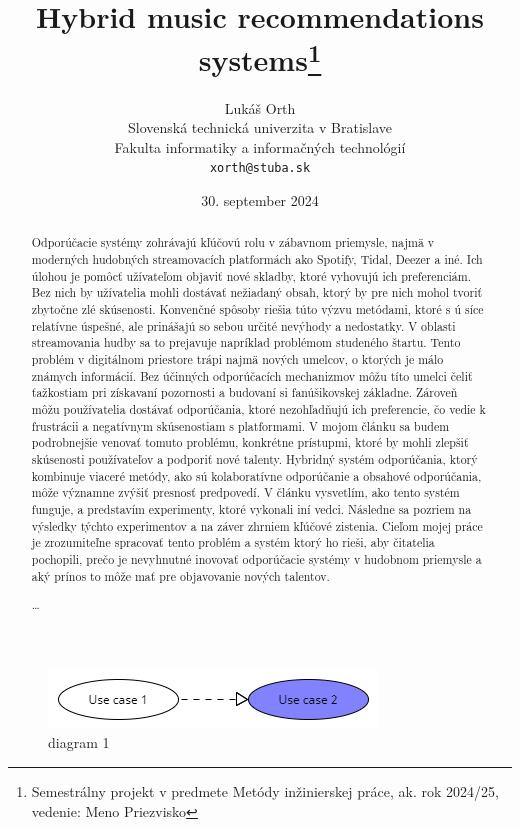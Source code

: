 \documentclass[10pt,twoside,slovak,a4paper]{coursepaper}
\title{Hybrid music recommendations systems\thanks{Semestrálny projekt v predmete Metódy inžinierskej práce, ak. rok 2024/25, vedenie: Meno Priezvisko}} %
\author{Lukáš Orth\\[2pt]
	{\small Slovenská technická univerzita v Bratislave}\\
	{\small Fakulta informatiky a informačných technológií}\\
	{\small \texttt{xorth@stuba.sk}}
	}
\date{\small 30. september 2024} %
\begin{document}
\maketitle

\begin{abstract}
Odporúčacie systémy zohrávajú kľúčovú rolu v zábavnom priemysle, najmä v moderných hudobných streamovacích platformách ako Spotify, Tidal, Deezer a iné. Ich úlohou je pomôcť užívateľom objaviť nové skladby, ktoré vyhovujú ich preferenciám. Bez nich by užívatelia mohli dostávať nežiadaný obsah, ktorý by pre nich mohol tvoriť zbytočne zlé skúsenosti. Konvenčné spôsoby riešia túto výzvu metódami, ktoré s	ú síce relatívne úspešné, ale prinášajú so sebou určité nevýhody a nedostatky. V oblasti streamovania hudby sa to prejavuje napríklad problémom studeného štartu. Tento problém v digitálnom priestore trápi najmä nových umelcov, o ktorých je málo známych informácií. Bez účinných odporúčacích mechanizmov môžu títo umelci čeliť ťažkostiam pri získavaní pozornosti a budovaní si fanúšikovskej základne. Zároveň môžu používatelia dostávať odporúčania, ktoré nezohľadňujú ich preferencie, čo vedie k frustrácii a negatívnym skúsenostiam s platformami.
V mojom článku sa budem podrobnejšie venovať tomuto problému, konkrétne prístupmi, ktoré by mohli zlepšiť skúsenosti používateľov a podporiť nové talenty. Hybridný systém odporúčania, ktorý kombinuje viaceré metódy, ako sú kolaboratívne odporúčanie a obsahové odporúčania, môže významne zvýšiť presnosť predpovedí. V článku vysvetlím, ako tento systém funguje, a predstavím experimenty, ktoré vykonali iní vedci. Následne sa pozriem na výsledky týchto experimentov a na záver zhrniem kľúčové zistenia. Cieľom mojej práce je zrozumiteľne spracovať tento problém a systém ktorý ho rieši, aby čitatelia pochopili, prečo je nevyhnutné inovovať odporúčacie systémy v hudobnom priemysle a aký prínos to môže mať pre objavovanie nových talentov.


\ldots
\end{abstract}

\begin{figure}
\includegraphics[width=1\linewidth]{diagramtest1.png}
\caption{diagram 1}
\end{figure}
\end{document}
